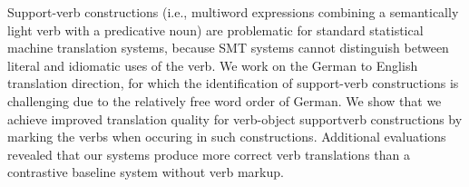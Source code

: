 Support-verb constructions (i.e., multiword expressions combining a semantically light verb with a predicative noun) are problematic for standard statistical machine translation systems, because SMT systems cannot distinguish between literal and idiomatic uses of the verb. We work on the German to English translation direction, for which the identification of support-verb constructions is challenging due to the relatively free word order of German. We show that we achieve improved translation quality for verb-object supportverb constructions by marking the verbs when occuring in such constructions. Additional evaluations revealed that our systems produce more correct verb translations than a contrastive baseline system without verb markup.
